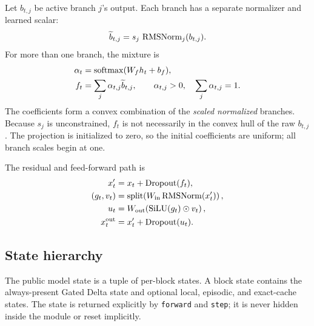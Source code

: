 Let \(b_{t,j}\) be active branch \(j\)'s output. Each branch has a separate
normalizer and learned scalar:
\begin{equation}
  \widetilde b_{t,j}
  =s_j\,\operatorname{RMSNorm}_j(b_{t,j}).
\end{equation}
For more than one branch, the mixture is
\begin{align}
  \alpha_t &= \operatorname{softmax}(W_fh_t+b_f),\\
  f_t &= \sum_j\alpha_{t,j}\widetilde b_{t,j},
  \qquad \alpha_{t,j}>0,\quad\sum_j\alpha_{t,j}=1.
  \label{eq:fusion}
\end{align}
The coefficients form a convex combination of the \emph{scaled normalized}
branches. Because \(s_j\) is unconstrained, \(f_t\) is not necessarily in the
convex hull of the raw \(b_{t,j}\). The projection is initialized to zero, so
the initial coefficients are uniform; all branch scales begin at one.

The residual and feed-forward path is
\begin{align}
  x_t' &= x_t+\operatorname{Dropout}(f_t),\\
  (g_t,v_t) &=
  \operatorname{split}\!\left(W_{\mathrm{in}}\operatorname{RMSNorm}(x_t')\right),\\
  u_t &= W_{\mathrm{out}}\!\left(\operatorname{SiLU}(g_t)\odot v_t\right),\\
  x_t^{\mathrm{out}} &= x_t'+\operatorname{Dropout}(u_t).
  \label{eq:swiglu}
\end{align}

\subsection{State hierarchy}

The public model state is a tuple of per-block states. A block state contains
the always-present Gated Delta state and optional local, episodic, and
exact-cache states. The state is returned explicitly by \texttt{forward} and
\texttt{step}; it is never hidden inside the module or reset implicitly.

\begin{center}
\label{fig:state-tree}
\end{center}

